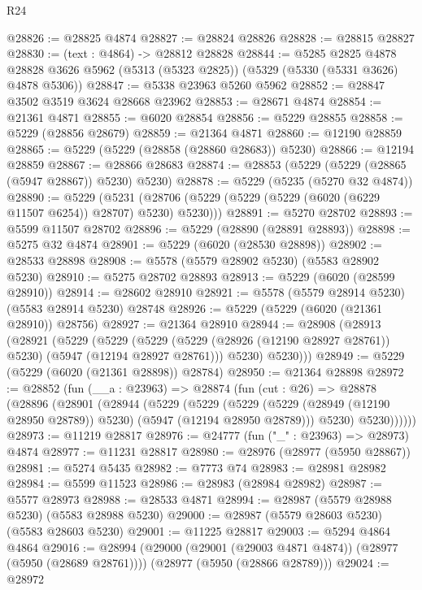 \begin{lexlean}{R24}
\begin{coremodule}
@28826 := @28825 @4874
@28827 := @28824 @28826
@28828 := @28815 @28827
@28830 := (text : @4864) -> @28812 @28828
@28844 := @5285
    @2825
    @4878
    @28828
    @3626
    @5962
    (@5313 (@5323 @2825))
    (@5329 (@5330 (@5331 @3626) @4878 @5306))
@28847 := @5338 @23963 @5260 @5962
@28852 := @28847 @3502 @3519 @3624 @28668 @23962
@28853 := @28671 @4874
@28854 := @21361 @4871
@28855 := @6020 @28854
@28856 := @5229 @28855
@28858 := @5229 (@28856 @28679)
@28859 := @21364 @4871
@28860 := @12190 @28859
@28865 := @5229 (@5229 (@28858 (@28860 @28683)) @5230)
@28866 := @12194 @28859
@28867 := @28866 @28683
@28874 := @28853 (@5229 (@5229 (@28865 (@5947 @28867)) @5230) @5230)
@28878 := @5229 (@5235 (@5270 @32 @4874))
@28890 := @5229
    (@5231 (@28706 (@5229 (@5229 (@5229 (@6020 (@6229 @11507 @6254)) @28707) @5230) @5230)))
@28891 := @5270 @28702
@28893 := @5599 @11507 @28702
@28896 := @5229 (@28890 (@28891 @28893))
@28898 := @5275 @32 @4874
@28901 := @5229 (@6020 (@28530 @28898))
@28902 := @28533 @28898
@28908 := @5578 (@5579 @28902 @5230) (@5583 @28902 @5230)
@28910 := @5275 @28702 @28893
@28913 := @5229 (@6020 (@28599 @28910))
@28914 := @28602 @28910
@28921 := @5578 (@5579 @28914 @5230) (@5583 @28914 @5230) @28748
@28926 := @5229 (@5229 (@6020 (@21361 @28910)) @28756)
@28927 := @21364 @28910
@28944 := @28908
    (@28913
      (@28921
        (@5229
          (@5229
            (@5229 (@5229 (@28926 (@12190 @28927 @28761)) @5230) (@5947 (@12194 @28927 @28761)))
            @5230)
          @5230)))
@28949 := @5229 (@5229 (@6020 (@21361 @28898)) @28784)
@28950 := @21364 @28898
@28972 := @28852
    (fun (__a : @23963) =>
    @28874
      (fun (cut : @26) =>
      @28878
        (@28896
          (@28901
            (@28944
              (@5229
                (@5229
                  (@5229
                    (@5229 (@28949 (@12190 @28950 @28789)) @5230)
                    (@5947 (@12194 @28950 @28789)))
                  @5230)
                @5230))))))
@28973 := @11219 @28817
@28976 := @24777 (fun ("_" : @23963) => @28973) @4874
@28977 := @11231 @28817
@28980 := @28976 (@28977 (@5950 @28867))
@28981 := @5274 @5435
@28982 := @7773 @74
@28983 := @28981 @28982
@28984 := @5599 @11523
@28986 := @28983 (@28984 @28982)
@28987 := @5577 @28973
@28988 := @28533 @4871
@28994 := @28987 (@5579 @28988 @5230) (@5583 @28988 @5230)
@29000 := @28987 (@5579 @28603 @5230) (@5583 @28603 @5230)
@29001 := @11225 @28817
@29003 := @5294 @4864 @4864
@29016 := @28994
    (@29000 (@29001 (@29003 @4871 @4874)) (@28977 (@5950 (@28689 @28761))))
    (@28977 (@5950 (@28866 @28789)))
@29024 := @28972

\end{coremodule}
\end{lexlean}

